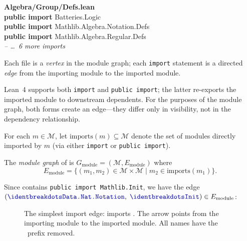 \begin{codebox}
\textsf{\bfseries\color{blue!60!black}Algebra/Group/Defs.lean}\\[2pt]
\textbf{public import} \textcolor{blue!60!black}{Batteries.Logic}\\
\textbf{public import} \textcolor{blue!60!black}{Mathlib.Algebra.Notation.Defs}\\
\textbf{public import} \textcolor{blue!60!black}{Mathlib.Algebra.Regular.Defs}\\
\hspace{1.5em}\textit{\color{gray}-- \ldots\ 6 more imports}
\end{codebox}

\noindent
Each file is a \emph{vertex} in the module graph; each \texttt{import} statement is a directed \emph{edge} from the importing module to the imported module.

Lean~4 supports both \texttt{import} and \texttt{public import}; the latter re-exports the imported module to downstream dependents. For the purposes of the module graph, both forms create an edge---they differ only in visibility, not in the dependency relationship.

\begin{definition}
For each $m \in \mathcal{M}$, let $\mathrm{imports}(m) \subseteq \mathcal{M}$ denote the set of modules directly imported by $m$ (via either \texttt{import} or \texttt{public import}).
\end{definition}

\begin{definition}\label{def:module-graph}
The \emph{module graph} of  is $G_{\mathrm{module}} = (\mathcal{M}, E_{\mathrm{module}})$ where
\[
  E_{\mathrm{module}} = \{(m_1, m_2) \in \mathcal{M} \times \mathcal{M} \mid m_2 \in \mathrm{imports}(m_1)\}.
\]
\end{definition}

Since  contains \texttt{public import Mathlib.Init}, we have the edge $(\module{Data.Nat.Notation},\; \module{Init}) \in E_{\mathrm{module}}$:

\begin{figure}[H]
\centering
{}
\caption{The simplest import edge:  imports . The arrow points from the importing module to the imported module. All names have the \ prefix removed.}
\label{fig:single-import-edge}
\end{figure}

